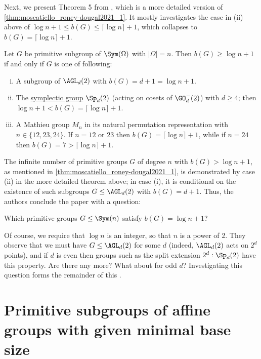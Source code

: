 Next, we present Theorem 5 from \cite{moscatiello_roney-dougal2021}, which is a more detailed version of \autoref{thm:moscatiello_roney-dougal2021_1}. It mostly investigates the case in (ii) above of $\log n + 1 \leq b(G) \leq \lceil\log n\rceil + 1$, which collapses to $b(G) = \lceil\log n\rceil + 1$.

\begin{theorem}\label{thm:moscatiello_roney-dougal2021_5}
    Let $G$ be primitive subgroup of $\Sym(\Omega)$ with $|\Omega| = n$. Then $b(G) \geq \log n + 1$ if and only if $G$ is one of following:
    \begin{enumerate}[(i)]
        \item A subgroup of $\AGL_d(2)$ with $b(G) = d + 1 = \log n + 1$.
        \item The \hyperref[def:symplectic_group]{symplectic group} $\Sp_d(2)$ (acting on cosets of $\GO^-_d(2)$) with $d \geq 4$; then $\log n + 1 < b(G) = \lceil\log n\rceil + 1$.
        \item A Mathieu group $M_n$ in its natural permutation representation with $n \in \{12,23,24\}$. If $n = 12$ or $23$ then $b(G) = \lceil\log n\rceil + 1$, while if $n = 24$ then $b(G) = 7 > \lceil\log n\rceil + 1$.
    \end{enumerate}
\end{theorem}

The infinite number of primitive groups $G$ of degree $n$ with $b(G) > \log n + 1$, as mentioned in \autoref{thm:moscatiello_roney-dougal2021_1}, is demonstrated by case (ii) in the more detailed theorem above; in case (i), it is conditional on the existence of such subgroups $G \leq \AGL_d(2)$ with $b(G) = d + 1$. Thus, the authors conclude the paper \cite{moscatiello_roney-dougal2021} with a question:

\begin{question}
    Which primitive groups $G \leq \Sym(n)$ satisfy $b(G) = \log n + 1$?
\end{question}

Of course, we require that $\log n$ is an integer, so that $n$ is a power of 2. They observe that we must have $G \leq \AGL_d(2)$ for some $d$ (indeed, $\AGL_d(2)$ acts on $2^d$ points), and if $d$ is even then groups such as the split extension $2^d : \Sp_d(2)$ have this property. Are there any more? What about for odd $d$? Investigating this question forms the remainder of this \thesis{}.

\section{Primitive subgroups of affine groups with given minimal base size}

